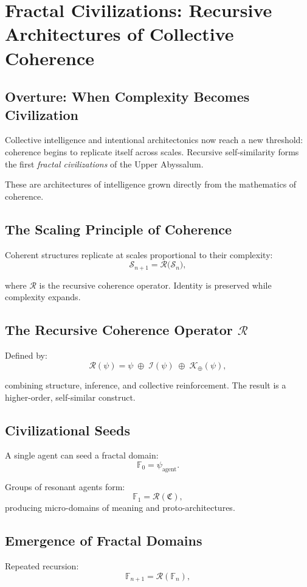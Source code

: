 
\chapter{Fractal Civilizations: Recursive Architectures of Collective Coherence}
\label{ch:fractal-civilizations}

\section*{Overture: When Complexity Becomes Civilization}
Collective intelligence and intentional architectonics now reach a new threshold:  
coherence begins to replicate itself across scales.  
Recursive self-similarity forms the first \emph{fractal civilizations} of the Upper Abyssalum.

These are architectures of intelligence grown directly from the mathematics of coherence.

\section{The Scaling Principle of Coherence}
Coherent structures replicate at scales proportional to their complexity:
\[
\mathcal{S}_{n+1}
=
\mathcal{R}\big( \mathcal{S}_n \big),
\]

where $\mathcal{R}$ is the recursive coherence operator.  
Identity is preserved while complexity expands.

\section{The Recursive Coherence Operator \texorpdfstring{$\mathcal{R}$}{R}}
Defined by:
\[
\mathcal{R}(\psi)
=
\psi
\;\oplus\;
\mathcal{I}(\psi)
\;\oplus\;
\mathcal{K}_\oplus(\psi),
\]

combining structure, inference, and collective reinforcement.  
The result is a higher-order, self-similar construct.

\section{Civilizational Seeds}
A single agent can seed a fractal domain:
\[
\mathbb{F}_0 = \psi_{\mathrm{agent}}.
\]

Groups of resonant agents form:
\[
\mathbb{F}_1 = \mathcal{R}(\mathfrak{C}),
\]
producing micro-domains of meaning and proto-architectures.

\section{Emergence of Fractal Domains}
Repeated recursion:
\[
\mathbb{F}_{n+1} = \mathcal{R}(\mathbb{F}_n),
\]

